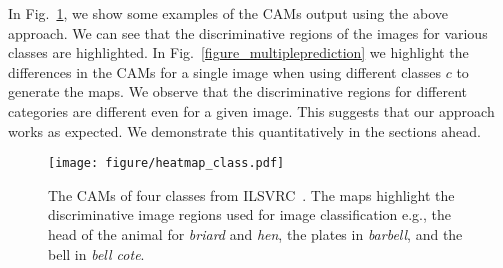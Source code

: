 \documentclass[10pt,twocolumn,letterpaper]{article}
\begin{document}
In Fig.~\ref{figure_examplemapping}, we show some examples of the CAMs output using the above approach. We can see that the discriminative regions of the images for various classes are highlighted. In Fig.~\ref{figure_multipleprediction} we highlight the differences in the CAMs for a single image when using different classes $c$ to generate the maps. We observe that the discriminative regions for different categories are different even for a given image. This suggests that our approach works as expected. We demonstrate this quantitatively in the sections ahead.




\begin{figure}
\begin{center}
\texttt{[image: figure/heatmap\_class.pdf]}
\end{center}
\vspace*{-4mm}
 \caption{The CAMs of four classes from ILSVRC~\cite{ILSVRCijcv15}. The maps highlight the discriminative image regions used for image classification e.g., the head of the animal for \textit{briard} and \textit{hen}, the plates in \textit{barbell}, and the bell in \textit{bell cote}.}\label{figure_examplemapping}
\end{figure}
\end{document}
